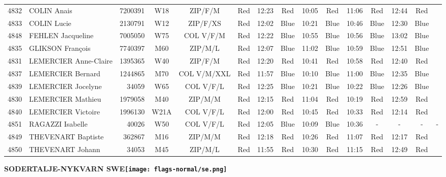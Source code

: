 \documentclass{report}
\begin{document}
\begin{longtable}{|c|l|r|c|c|*{5}{cc|}}
    4832 & COLIN Anais & 7200391 & W18 & ZIP/F/M & Red & 12:23 & Red & 10:05 & Red & 11:06 & Red & 12:44 & Red &  \\
    4833 & COLIN Lucie & 2130791 & W12 & ZIP/F/XS & Red & 12:02 & Blue & 10:21 & Blue & 10:46 & Blue & 12:30 & Blue &  \\
    4848 & FEHLEN Jacqueline & 7005050 & W75 & COL V/F/M & Red & 12:22 & Blue & 10:55 & Blue & 10:56 & Blue & 13:02 & Blue &  \\
    4835 & GLIKSON François & 7740397 & M60 & ZIP/M/L & Red & 12:07 & Blue & 11:02 & Blue & 10:59 & Blue & 12:51 & Blue &  \\
    4831 & LEMERCIER Anne-Claire & 1395365 & W40 & ZIP/F/M & Red & 12:20 & Red & 10:41 & Red & 10:58 & Red & 12:40 & Red &  \\
    4837 & LEMERCIER Bernard & 1244865 & M70 & COL V/M/XXL & Red & 11:57 & Blue & 10:10 & Blue & 11:00 & Blue & 12:35 & Blue &  \\
    4839 & LEMERCIER Jocelyne & 34059 & W65 & COL V/F/L & Red & 12:25 & Blue & 10:21 & Blue & 10:22 & Blue & 12:26 & Blue &  \\
    4830 & LEMERCIER Mathieu & 1979058 & M40 & ZIP/M/M & Red & 12:15 & Red & 11:04 & Red & 10:19 & Red & 12:59 & Red &  \\
    4840 & LEMERCIER Victoire & 1996130 & W21A & COL V/F/L & Red & 12:00 & Red & 10:45 & Red & 10:33 & Red & 12:14 & Red &  \\
    4851 & RAGAZZI Isabelle & 40026 & W50 & COL V/F/L & Red & 12:05 & Blue & 10:09 & Blue & 10:36 & - &  - & - &  -\\
    4849 & THEVENART Baptiste & 362867 & M16 & ZIP/M/M & Red & 12:18 & Red & 10:26 & Red & 11:07 & Red & 12:17 & Red &  \\
    4850 & THEVENART Johann & 34053 & M45 & ZIP/M/L & Red & 11:55 & Red & 10:30 & Red & 11:15 & Red & 12:49 & Red &  \\
  \end{longtable}
\newpage
  \Huge \centering \bfseries SODERTALJE-NYKVARN  SWE\normalfont \footnotesize \sffamily \hfill \texttt{[image: flags-normal/se.png]} \newline 
\end{document}
